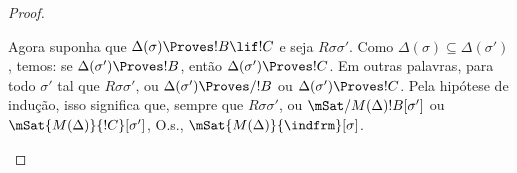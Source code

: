 \documentclass[../../../include/open-logic-section]{subfiles}
\begin{document}
\begin{proof}
\begin{enumerate}
{        Agora suponha que $\Delta(\sigma) \Proves !B \lif !C$ e seja
        $R\sigma\sigma'$. Como $\Delta(\sigma) \subseteq
        \Delta(\sigma')$, temos: se $\Delta(\sigma') \Proves
        !B$, então $\Delta(\sigma') \Proves !C$. Em outras palavras, para
        todo $\sigma'$ tal que $R\sigma\sigma'$, ou
        $\Delta(\sigma') \Proves/ !B$ ou $\Delta(\sigma') \Proves
        !C$. Pela hipótese de indução, isso significa que, sempre que
        $R\sigma\sigma'$, ou $\mSat/{M(\Delta)}{!B}[\sigma']$ ou
        $\mSat{M(\Delta)}{!C}[\sigma']$, O.s.\@,
        $\mSat{M(\Delta)}{\indfrm}[\sigma]$.}
  \end{enumerate}
\end{proof}
\end{document}
